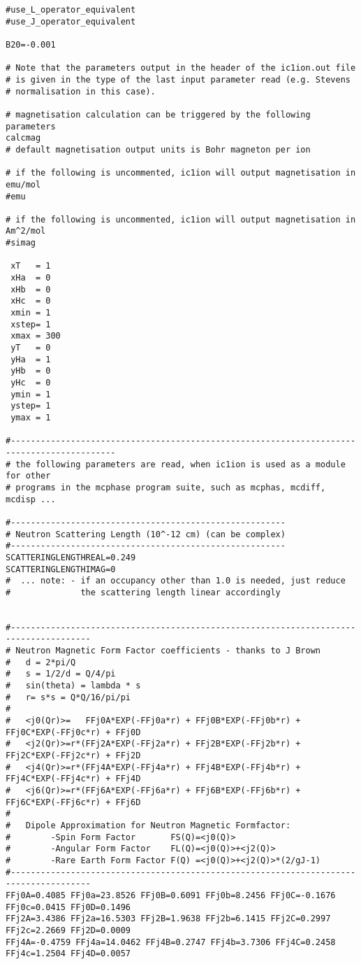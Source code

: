 {\begin{verbatim}
#use_L_operator_equivalent
#use_J_operator_equivalent

B20=-0.001

# Note that the parameters output in the header of the ic1ion.out file
# is given in the type of the last input parameter read (e.g. Stevens
# normalisation in this case).

# magnetisation calculation can be triggered by the following parameters
calcmag
# default magnetisation output units is Bohr magneton per ion

# if the following is uncommented, ic1ion will output magnetisation in emu/mol
#emu

# if the following is uncommented, ic1ion will output magnetisation in Am^2/mol
#simag

 xT   = 1
 xHa  = 0
 xHb  = 0
 xHc  = 0
 xmin = 1
 xstep= 1
 xmax = 300
 yT   = 0
 yHa  = 1
 yHb  = 0
 yHc  = 0
 ymin = 1
 ystep= 1
 ymax = 1

#-------------------------------------------------------------------------------------------
# the following parameters are read, when ic1ion is used as a module for other
# programs in the mcphase program suite, such as mcphas, mcdiff, mcdisp ...

#-------------------------------------------------------
# Neutron Scattering Length (10^-12 cm) (can be complex)
#-------------------------------------------------------
SCATTERINGLENGTHREAL=0.249
SCATTERINGLENGTHIMAG=0
#  ... note: - if an occupancy other than 1.0 is needed, just reduce 
#              the scattering length linear accordingly
 
 
#--------------------------------------------------------------------------------------
# Neutron Magnetic Form Factor coefficients - thanks to J Brown
#   d = 2*pi/Q      
#   s = 1/2/d = Q/4/pi   
#   sin(theta) = lambda * s
#   r= s*s = Q*Q/16/pi/pi
#
#   <j0(Qr)>=   FFj0A*EXP(-FFj0a*r) + FFj0B*EXP(-FFj0b*r) + FFj0C*EXP(-FFj0c*r) + FFj0D
#   <j2(Qr)>=r*(FFj2A*EXP(-FFj2a*r) + FFj2B*EXP(-FFj2b*r) + FFj2C*EXP(-FFj2c*r) + FFj2D
#   <j4(Qr)>=r*(FFj4A*EXP(-FFj4a*r) + FFj4B*EXP(-FFj4b*r) + FFj4C*EXP(-FFj4c*r) + FFj4D
#   <j6(Qr)>=r*(FFj6A*EXP(-FFj6a*r) + FFj6B*EXP(-FFj6b*r) + FFj6C*EXP(-FFj6c*r) + FFj6D
#
#   Dipole Approximation for Neutron Magnetic Formfactor:
#        -Spin Form Factor       FS(Q)=<j0(Q)>
#        -Angular Form Factor    FL(Q)=<j0(Q)>+<j2(Q)>
#        -Rare Earth Form Factor F(Q) =<j0(Q)>+<j2(Q)>*(2/gJ-1)
#--------------------------------------------------------------------------------------
FFj0A=0.4085 FFj0a=23.8526 FFj0B=0.6091 FFj0b=8.2456 FFj0C=-0.1676 FFj0c=0.0415 FFj0D=0.1496     
FFj2A=3.4386 FFj2a=16.5303 FFj2B=1.9638 FFj2b=6.1415 FFj2C=0.2997 FFj2c=2.2669 FFj2D=0.0009     
FFj4A=-0.4759 FFj4a=14.0462 FFj4B=0.2747 FFj4b=3.7306 FFj4C=0.2458 FFj4c=1.2504 FFj4D=0.0057 



\end{verbatim}}
